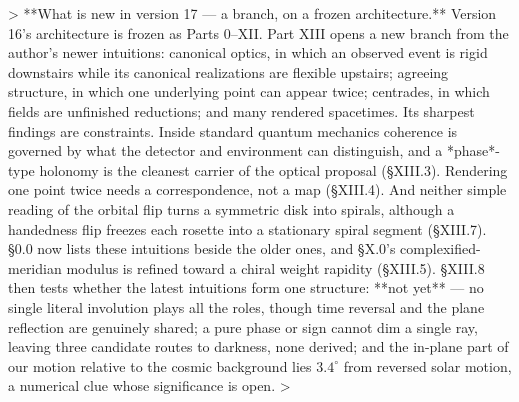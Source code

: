 > **What is new in version 17 — a branch, on a frozen architecture.** Version 16's architecture is frozen as Parts 0–XII. Part XIII opens a new branch from the author's newer intuitions: canonical optics, in which an observed event is rigid downstairs while its canonical realizations are flexible upstairs; agreeing structure, in which one underlying point can appear twice; centrades, in which fields are unfinished reductions; and many rendered spacetimes. Its sharpest findings are constraints. Inside standard quantum mechanics coherence is governed by what the detector and environment can distinguish, and a *phase*-type holonomy is the cleanest carrier of the optical proposal (§XIII.3). Rendering one point twice needs a correspondence, not a map (§XIII.4). And neither simple reading of the orbital flip turns a symmetric disk into spirals, although a handedness flip freezes each rosette into a stationary spiral segment (§XIII.7). §0.0 now lists these intuitions beside the older ones, and §X.0's complexified-meridian modulus is refined toward a chiral weight rapidity (§XIII.5). §XIII.8 then tests whether the latest intuitions form one structure: **not yet** — no single literal involution plays all the roles, though time reversal and the plane reflection are genuinely shared; a pure phase or sign cannot dim a single ray, leaving three candidate routes to darkness, none derived; and the in-plane part of our motion relative to the cosmic background lies $3.4^\circ$ from reversed solar motion, a numerical clue whose significance is open.
>
